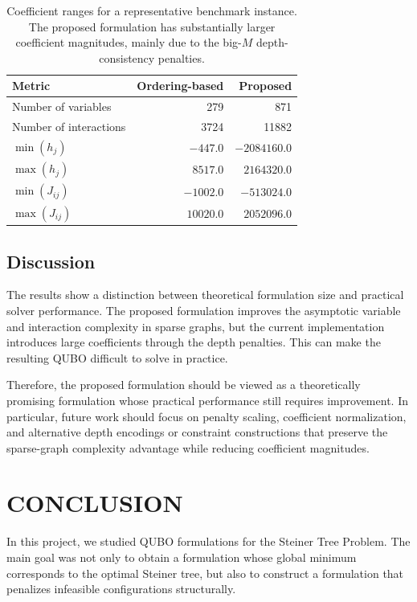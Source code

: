 \documentclass[a4paper,12pt]{report}
\begin{document}
\begin{table}[htbp]
\centering
\begin{tabular}{lrr}
\toprule
\textbf{Metric} & \textbf{Ordering-based} & \textbf{Proposed} \\
\midrule
Number of variables & 279 & 871 \\
Number of interactions & 3724 & 11882 \\
$\min(h_j)$ & $-447.0$ & $-2084160.0$ \\
$\max(h_j)$ & $8517.0$ & $2164320.0$ \\
$\min(J_{ij})$ & $-1002.0$ & $-513024.0$ \\
$\max(J_{ij})$ & $10020.0$ & $2052096.0$ \\
\bottomrule
\end{tabular}
\caption{Coefficient ranges for a representative benchmark instance. The proposed formulation has substantially larger coefficient magnitudes, mainly due to the big-\(M\) depth-consistency penalties.}
\label{tab:coefficient_ranges}
\end{table}

\section{Discussion}

The results show a distinction between theoretical formulation size and practical solver performance. The proposed formulation improves the asymptotic variable and interaction complexity in sparse graphs, but the current implementation introduces large coefficients through the depth penalties. This can make the resulting QUBO difficult to solve in practice.

Therefore, the proposed formulation should be viewed as a theoretically promising formulation whose practical performance still requires improvement. In particular, future work should focus on penalty scaling, coefficient normalization, and alternative depth encodings or constraint constructions that preserve the sparse-graph complexity advantage while reducing coefficient magnitudes.

\chapter{CONCLUSION}

In this project, we studied QUBO formulations for the Steiner Tree Problem. The main goal was not only to obtain a formulation whose global minimum corresponds to the optimal Steiner tree, but also to construct a formulation that penalizes infeasible configurations structurally.
\end{document}
